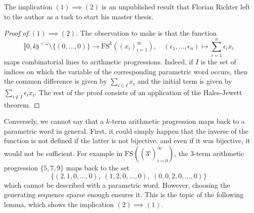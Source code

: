 \documentclass{article}
\theoremstyle{definition}
\theoremstyle{plain}
\theoremstyle{remark}
\newcommand{\FS}[2][]{\ensuremath{\mathrm{FS}^{#1}\left(#2\right)}}
\newcommand{\seq}[2]{\ensuremath{\left ( {#1}_{#2}\right )_{#2 = 1}^\infty }}
\begin{document}
The implication $(1) \implies (2)$ is an unpublished result that Florian Richter left to the author as a task to start his master thesis.
\begin{proof}[Proof of $(1) \implies (2)$]
    The observation to make is that the function
    $$ \llbracket 0,k \rrparenthesis^{< \omega} \setminus \{(0,\ldots,0)\}\to \FS[k]{\seq{x}{i}}, \quad (\epsilon_1,\ldots,\epsilon_n) \mapsto \sum_{i=1}^n \epsilon_i x_i$$
    maps combinatorial lines to arithmetic progressions. Indeed, if $I$ is the set of indices on which the variable of the corresponding parametric word occurs, then the common difference is given by $\sum_{i\in I} x_i$ and the initial term is given by $\sum_{i \notin I} \epsilon_i x_i$.
    The rest of the proof consists of an application of the Hales-Jewett theorem.
\end{proof}

Conversely, we cannot say that a $k$-term arithmetic progression maps back to a parametric word in general. First, it could simply happen that the inverse of the function is not defined if the latter is not bijective. and even if it was bijective, it would not be sufficient. For example in $\FS{(3^i)_{i=0}^\infty}$, the $3$-term arithmetic progression $\{5,7,9\}$ maps back to the set
$$\{(2,1,0,\ldots,0), \; (1,2,0,\ldots,0), \; (0,0,2,0,\ldots,0)\}$$
which cannot be described with a parametric word. However, choosing the generating sequence sparse enough ensures it. This is the topic of the following lemma, which shows the implication $(2) \implies (1)$.
\end{document}
